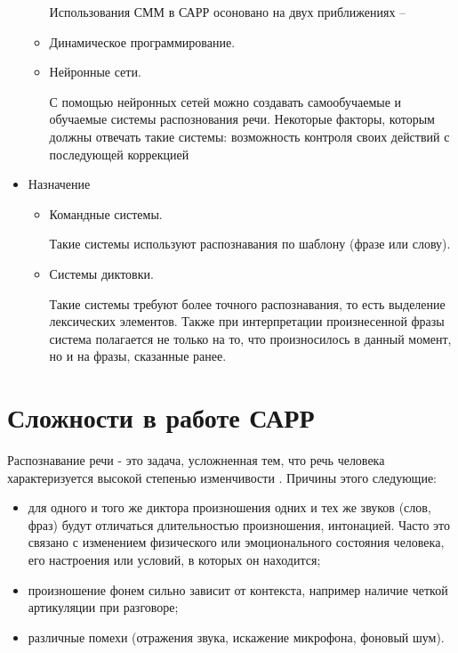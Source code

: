 \begin{itemize}
\begin{itemize}
		
		Использования СММ в САРР осоновано на двух приближениях -- 
		
		\item Динамическое программирование.
		\item Нейронные сети.
		
		С помощью нейронных сетей можно создавать самообучаемые и обучаемые системы распознования речи. Некоторые факторы, которым должны отвечать такие системы: возможность контроля своих действий с последующей коррекцией
		
	\end{itemize}
	
	\item Назначение
	\begin{itemize}
		\item Командные системы.
		
		Такие системы используют распознавания по шаблону (фразе или слову).
		
		\item Системы диктовки.
		
		Такие системы требуют более точного распознавания, то есть выделение лексических элементов. Также при интерпретации произнесенной фразы система полагается не только на то, что произносилось в данный момент, но и на фразы, сказанные ранее.
		
	\end{itemize}
\end{itemize}

\section{Сложности в работе САРР}
Распознавание речи - это задача, усложненная тем, что речь человека характеризуется высокой степенью изменчивости \cite{spr}. Причины этого следующие:
\begin{itemize}
	\item для одного и того же диктора произношения одних и тех же звуков (слов, фраз) будут отличаться длительностью произношения, интонацией. Часто это связано с изменением физического или эмоционального состояния человека, его настроения или условий, в которых он находится;
	\item произношение фонем сильно зависит от контекста, например наличие четкой артикуляции при разговоре;
	\item различные помехи (отражения звука, искажение микрофона, фоновый шум).
\end{itemize}

